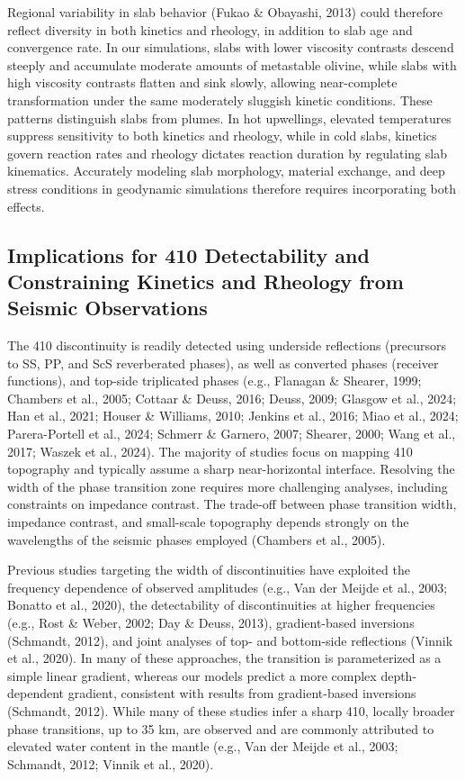 \documentclass[draft,linenumbers]{agujournal2019}
\begin{document}
Regional variability in slab behavior (Fukao \& Obayashi, 2013) could
therefore reflect diversity in both kinetics and rheology, in addition
to slab age and convergence rate. In our simulations, slabs with lower
viscosity contrasts descend steeply and accumulate moderate amounts of
metastable olivine, while slabs with high viscosity contrasts flatten
and sink slowly, allowing near-complete transformation under the same
moderately sluggish kinetic conditions. These patterns distinguish slabs
from plumes. In hot upwellings, elevated temperatures suppress
sensitivity to both kinetics and rheology, while in cold slabs, kinetics
govern reaction rates and rheology dictates reaction duration by
regulating slab kinematics. Accurately modeling slab morphology,
material exchange, and deep stress conditions in geodynamic simulations
therefore requires incorporating both effects.

\subsection{Implications for 410 Detectability and Constraining Kinetics
and Rheology from Seismic Observations}\label{sec:410-detectability}

The 410 discontinuity is readily detected using underside reflections
(precursors to SS, PP, and ScS reverberated phases), as well as
converted phases (receiver functions), and top-side triplicated phases
(e.g., Flanagan \& Shearer, 1999; Chambers et al., 2005; Cottaar \&
Deuss, 2016; Deuss, 2009; Glasgow et al., 2024; Han et al., 2021; Houser
\& Williams, 2010; Jenkins et al., 2016; Miao et al., 2024;
Parera-Portell et al., 2024; Schmerr \& Garnero, 2007; Shearer, 2000;
Wang et al., 2017; Waszek et al., 2024). The majority of studies focus
on mapping 410 topography and typically assume a sharp near-horizontal
interface. Resolving the width of the phase transition zone requires
more challenging analyses, including constraints on impedance contrast.
The trade-off between phase transition width, impedance contrast, and
small-scale topography depends strongly on the wavelengths of the
seismic phases employed (Chambers et al., 2005).

Previous studies targeting the width of discontinuities have exploited
the frequency dependence of observed amplitudes (e.g., Van der Meijde et
al., 2003; Bonatto et al., 2020), the detectability of discontinuities
at higher frequencies (e.g., Rost \& Weber, 2002; Day \& Deuss, 2013),
gradient-based inversions (Schmandt, 2012), and joint analyses of top-
and bottom-side reflections (Vinnik et al., 2020). In many of these
approaches, the transition is parameterized as a simple linear gradient,
whereas our models predict a more complex depth-dependent gradient,
consistent with results from gradient-based inversions (Schmandt, 2012).
While many of these studies infer a sharp 410, locally broader phase
transitions, up to 35 km, are observed and are commonly attributed to
elevated water content in the mantle (e.g., Van der Meijde et al., 2003;
Schmandt, 2012; Vinnik et al., 2020).
\end{document}
